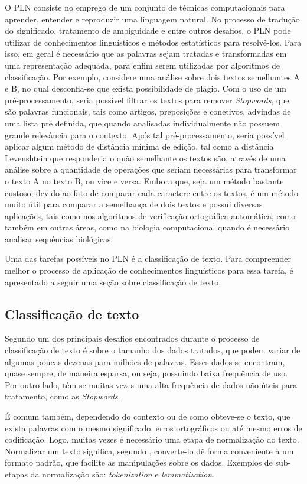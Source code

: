 O PLN consiste no emprego de um conjunto de técnicas computacionais para aprender, entender e reproduzir uma linguagem natural. No processo de tradução do significado, tratamento de ambiguidade e entre outros desafios, o PLN pode utilizar de conhecimentos linguísticos e métodos estatísticos para resolvê-los. Para isso, em geral é necessário que as palavras
sejam tratadas e transformadas em uma representação adequada, para enfim serem utilizadas por algoritmos de classificação. Por exemplo, considere uma análise sobre dois textos semelhantes A e B, no qual desconfia-se que exista possibilidade de plágio. Com o uso de um pré-processamento, seria possível filtrar os textos para remover \textit{Stopwords}, que são palavras funcionais, tais como artigos, preposições e conetivos, advindas de uma lista pré definida, que quando analisadas individualmente não possuem grande relevância para o contexto. Após tal pré-processamento, seria possível aplicar algum método de distância mínima de edição, tal como a distância Levenshtein que responderia o quão semelhante os textos são, através de uma análise sobre a quantidade de operações que seriam necessárias para transformar o texto A no texto B, ou vice e versa. Embora que, seja um método bastante custoso, devido ao fato de comparar cada caractere entre os textos, é um método muito útil para comparar a semelhança de dois textos e possui diversas aplicações, tais como nos algoritmos de verificação ortográfica automática, como também em outras áreas, como na biologia computacional quando é necessário analisar sequências biológicas.

Uma das tarefas possíveis no PLN é a classificação de texto. Para compreender melhor o processo de aplicação de conhecimentos linguísticos para essa tarefa, é apresentado a seguir uma seção sobre classificação de texto.

\subsection{Classificação de texto}
Segundo \cite{aggarwal2014data} um dos principais desafios encontrados durante o processo de classificação de texto é sobre o tamanho dos dados tratados, que podem variar de algumas poucas dezenas para milhões de palavras. Esses dados se encontram, quase sempre, de maneira esparsa, ou seja, possuindo baixa frequência de uso. Por outro lado, têm-se muitas vezes uma alta frequência de dados não úteis para tratamento, como as \textit{Stopwords}.

É comum também, dependendo do contexto ou de como obteve-se o texto, que exista palavras com o mesmo significado, erros ortográficos ou até mesmo erros de codificação. Logo, muitas vezes é necessário uma etapa de normalização do texto. Normalizar um texto significa, segundo \citep{martin2018speech}, converte-lo dê forma conveniente à um formato padrão, que facilite as manipulações sobre os dados. Exemplos de sub-etapas da normalização são: \textit{tokenization} e \textit{lemmatization}. 

